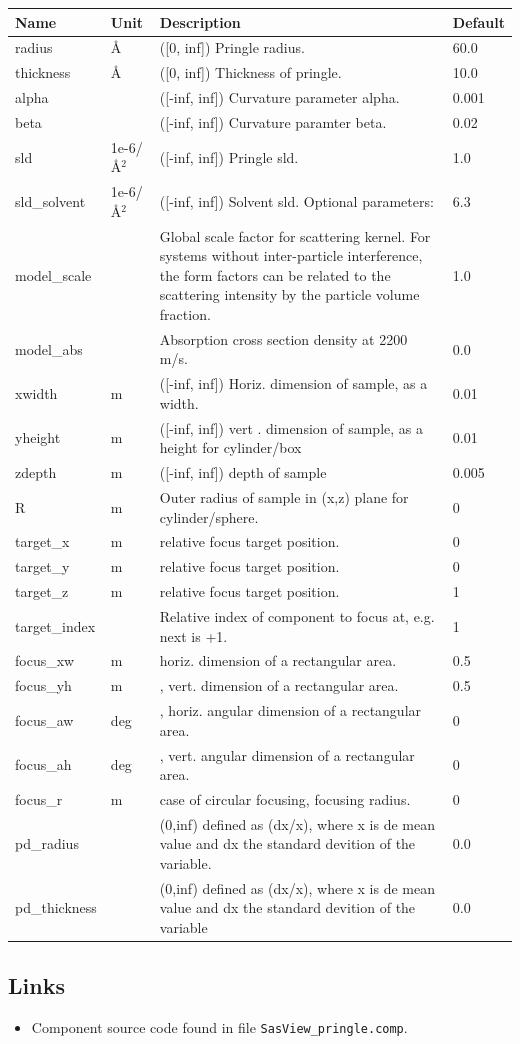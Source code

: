 \begin{longtable}{p{}p{}p{}p{}}
\toprule
\textbf{Name} & \textbf{Unit} & \textbf{Description} & \textbf{Default} \\
\midrule
\endhead
radius & \AA{} & ([0, inf]) Pringle radius. & 60.0 \\
thickness & \AA{} & ([0, inf]) Thickness of pringle. & 10.0 \\
alpha &  & ([-inf, inf]) Curvature parameter alpha. & 0.001 \\
beta &  & ([-inf, inf]) Curvature paramter beta. & 0.02 \\
sld & 1e-6/\AA{}$^{2}$ & ([-inf, inf]) Pringle sld. & 1.0 \\
sld\_solvent & 1e-6/\AA{}$^{2}$ & ([-inf, inf]) Solvent sld. Optional parameters: & 6.3 \\
model\_scale &   & Global scale factor for scattering kernel. For systems without inter-particle interference, the form factors can be related to the scattering intensity by the particle volume fraction. & 1.0 \\
model\_abs &   & Absorption cross section density at 2200 m/s. & 0.0 \\
xwidth & m & ([-inf, inf]) Horiz. dimension of sample, as a width. & 0.01 \\
yheight & m & ([-inf, inf]) vert . dimension of sample, as a height for cylinder/box & 0.01 \\
zdepth & m & ([-inf, inf]) depth of sample & 0.005 \\
R & m & Outer radius of sample in (x,z) plane for cylinder/sphere. & 0 \\
target\_x & m & relative focus target position. & 0 \\
target\_y & m & relative focus target position. & 0 \\
target\_z & m & relative focus target position. & 1 \\
target\_index &   & Relative index of component to focus at, e.g. next is +1. & 1 \\
focus\_xw & m & horiz. dimension of a rectangular area. & 0.5 \\
focus\_yh & m & , vert. dimension of a rectangular area. & 0.5 \\
focus\_aw & deg & , horiz. angular dimension of a rectangular area. & 0 \\
focus\_ah & deg & , vert. angular dimension of a rectangular area. & 0 \\
focus\_r & m & case of circular focusing, focusing radius. & 0 \\
pd\_radius &  & (0,inf) defined as (dx/x), where x is de mean value and dx the standard devition of the variable. & 0.0 \\
pd\_thickness &  & (0,inf) defined as (dx/x), where x is de mean value and dx the standard devition of the variable & 0.0 \\
\bottomrule
\end{longtable}

\subsection*{Links}
\begin{itemize}
  \item Component source code found in file \texttt{SasView\_pringle.comp}.
\end{itemize}
